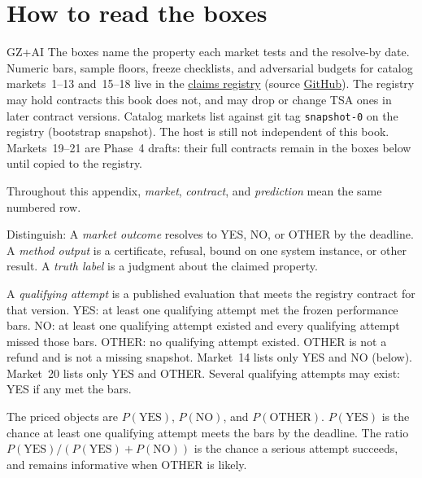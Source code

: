 \section{How to read the boxes}
\label{sec:appp-how-to-read}
\begin{authbar}{GZ+AI}
The boxes name the property each market tests and the resolve-by date.
Numeric bars, sample floors, freeze checklists, and adversarial budgets for catalog markets~1--13 and~15--18 live in the \href{\claimsbase/}{claims registry}
(source \href{https://github.com/aintelope/ai-safety-claims}{GitHub}).
The registry may hold contracts this book does not, and may drop or change TSA ones in later contract versions.
Catalog markets list against git tag \texttt{snapshot-0} on the registry (bootstrap snapshot).
The host is still not independent of this book.
Markets~19--21 are Phase~4 drafts: their full contracts remain in the boxes below until copied to the registry.

Throughout this appendix, \emph{market}, \emph{contract}, and \emph{prediction} mean the same numbered row.

Distinguish:
A \emph{market outcome} resolves to YES, NO, or OTHER by the deadline.
A \emph{method output} is a certificate, refusal, bound on one system instance, or other result.
A \emph{truth label} is a judgment about the claimed property.

A \emph{qualifying attempt} is a published evaluation that meets the registry contract for that version.
YES: at least one qualifying attempt met the frozen performance bars.
NO: at least one qualifying attempt existed and every qualifying attempt missed those bars.
OTHER: no qualifying attempt existed.
OTHER is not a refund and is not a missing snapshot.
Market~14 lists only YES and NO (below).
Market~20 lists only YES and OTHER.
Several qualifying attempts may exist: YES if any met the bars.

The priced objects are $P(\mathrm{YES})$, $P(\mathrm{NO})$, and $P(\mathrm{OTHER})$.
$P(\mathrm{YES})$ is the chance at least one qualifying attempt meets the bars by the deadline.
The ratio $P(\mathrm{YES})/(P(\mathrm{YES})+P(\mathrm{NO}))$ is the chance a serious attempt succeeds, and remains informative when OTHER is likely.

\end{authbar}
\authbarneedspace
